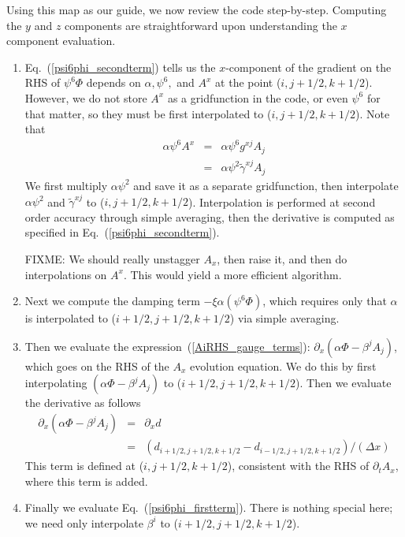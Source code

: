 \documentclass[showpacs,amsmath,amssymb,prd]{revtex4}
\newcommand{\beqn}{\begin{eqnarray}}
\newcommand{\eeqn}{\end{eqnarray}}
\begin{document}
Using this map as our guide, we now review the code
step-by-step. Computing the $y$ and $z$ components are
straightforward upon understanding the $x$ component evaluation.
\begin{enumerate}
\item Eq.~(\ref{psi6phi_secondterm}) tells us the $x$-component of the gradient on the
RHS of $\psi^6\Phi$ depends on $\alpha,\psi^6,$ and $A^x$ at the point
($i,j+1/2,k+1/2$). However, we do not store $A^x$ as a gridfunction in
the code, or even $\psi^6$ for that matter, so they must be first
interpolated to ($i,j+1/2,k+1/2$). Note that 
\beqn
\alpha \psi^6 A^x &=& \alpha \psi^6 g^{xj} A_j \\
&=& \alpha \psi^2 \tilde{\gamma}^{xj} A_j
\eeqn
We first multiply $\alpha \psi^2$ and save it as a separate
gridfunction, then interpolate $\alpha\psi^2$ and $\tilde{\gamma}^{xj}$ to
($i,j+1/2,k+1/2$). Interpolation is performed at second order accuracy
through simple averaging, then the derivative is computed as specified
in Eq.~(\ref{psi6phi_secondterm}).

FIXME: We should really unstagger $A_x$, then raise it, and then do
interpolations on $A^x$. This would yield a more efficient algorithm.

\item Next we compute the damping term $-\xi \alpha (\psi^6\Phi)$,
  which requires only that $\alpha$ is interpolated to
  ($i+1/2,j+1/2,k+1/2$) via simple averaging.

\item Then we evaluate the expression~(\ref{AiRHS_gauge_terms}):
$\partial_x (\alpha \Phi -\beta^j A_j)$, which goes on the RHS of the
$A_x$ evolution equation. We do this by first interpolating $(\alpha \Phi
-\beta^j A_j)$ to ($i+1/2,j+1/2,k+1/2$).  Then we evaluate the
derivative as follows
\beqn
\partial_x (\alpha \Phi -\beta^j A_j) &=& \partial_x d \\
&=& (d_{i+1/2,j+1/2,k+1/2} - d_{i-1/2,j+1/2,k+1/2})/(\Delta x)
\eeqn
This term is defined at ($i,j+1/2,k+1/2$), consistent with the RHS of
$\partial_t A_x$, where this term is added.

\item Finally we evaluate Eq.~(\ref{psi6phi_firstterm}). There is
  nothing special here; we need only interpolate $\beta^i$ to ($i+1/2,j+1/2,k+1/2$).
\end{enumerate}
\end{document}
